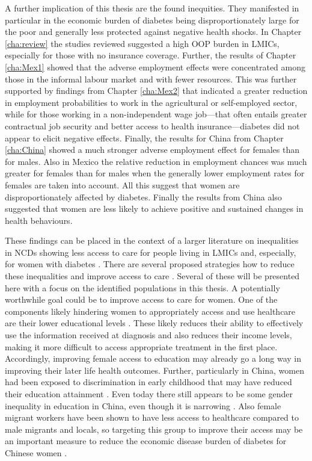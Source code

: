 A further implication of this thesis are the found inequities. They manifested in particular in the economic burden of diabetes being disproportionately large for the poor and generally less protected against negative health shocks. In Chapter \ref{cha:review} the studies reviewed suggested a high \ac{OOP} burden in \acp{LMIC}, especially for those with no insurance coverage. Further, the results of Chapter \ref{cha:Mex1} showed that the adverse employment effects were concentrated among those in the informal labour market and with fewer resources. This was further supported by findings from Chapter \ref{cha:Mex2} that indicated a greater reduction in employment probabilities to work in the agricultural or self-employed sector, while for those working in a non-independent wage job---that often entails greater contractual job security and better access to health insurance---diabetes did not appear to elicit negative effects. Finally, the results for China from Chapter \ref{cha:China} showed a much stronger adverse employment effect for females than for males. Also in Mexico the relative reduction in employment chances was much greater for females than for males when the generally lower employment rates for females are taken into account. All this suggest that women are disproportionately affected by diabetes. Finally the results from China also suggested that women are less likely to achieve positive and sustained changes in health behaviours.

These findings can be placed in the context of a larger literature on inequalities in \acp{NCD} showing less access to care for people living in \acp{LMIC} and, especially, for women with diabetes \parencite{DiCesare2013}. There are several proposed strategies how to reduce these inequalities and improve access to care \parencite{Jacobs2012}. Several of these will be presented here with a focus on the identified populations in this thesis. A potentially worthwhile goal could be to improve access to care for women. One of the components likely hindering women to appropriately access and use healthcare are their lower educational levels \parencite{Jacobs2012}. These likely reduces their ability to effectively use the information received at diagnosis and also reduces their income levels, making it more difficult to access appropriate treatment in the first place. Accordingly, improving female access to education may already go a long way in improving their later life health outcomes. Further, particularly in China, women had been exposed to discrimination in early childhood that may have reduced their education attainment \parencite{Zeng2014}. Even today there still appears to be some gender inequality in education in China, even though it is narrowing \parencite{Zeng2014}. Also female migrant workers have been shown to have less access to healthcare compared to male migrants and locals, so targeting this group to improve their access may be an important measure to reduce the economic disease burden of diabetes for Chinese women \parencite{Fan2013}. 

